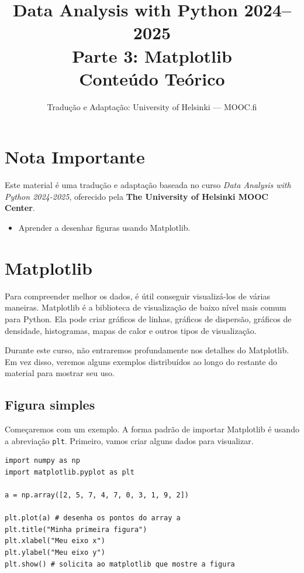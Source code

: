 \documentclass[11pt,a4paper]{article}
\title{\textbf{Data Analysis with Python 2024--2025}\\Parte 3: Matplotlib\\\large Conteúdo Teórico}
\author{Tradução e Adaptação: University of Helsinki --- MOOC.fi}
\date{}
\begin{document}
\maketitle

\section*{Nota Importante}
Este material é uma tradução e adaptação baseada no curso \textit{Data Analysis with Python 2024-2025}, oferecido pela \textbf{The University of Helsinki MOOC Center}.

\begin{objetivos}
\begin{itemize}
    \item Aprender a desenhar figuras usando Matplotlib.
\end{itemize}
\end{objetivos}

\tableofcontents
\newpage

\section{Matplotlib}

Para compreender melhor os dados, é útil conseguir visualizá-los de várias maneiras. Matplotlib é a biblioteca de visualização de baixo nível mais comum para Python. Ela pode criar gráficos de linhas, gráficos de dispersão, gráficos de densidade, histogramas, mapas de calor e outros tipos de visualização.

Durante este curso, não entraremos profundamente nos detalhes do Matplotlib. Em vez disso, veremos alguns exemplos distribuídos ao longo do restante do material para mostrar seu uso.

\subsection{Figura simples}

Começaremos com um exemplo. A forma padrão de importar Matplotlib é usando a abreviação \texttt{plt}. Primeiro, vamos criar alguns dados para visualizar.

\begin{lstlisting}
import numpy as np
import matplotlib.pyplot as plt

a = np.array([2, 5, 7, 4, 7, 0, 3, 1, 9, 2])

plt.plot(a) # desenha os pontos do array a
plt.title("Minha primeira figura")
plt.xlabel("Meu eixo x")
plt.ylabel("Meu eixo y")
plt.show() # solicita ao matplotlib que mostre a figura
\end{lstlisting}
\end{document}

